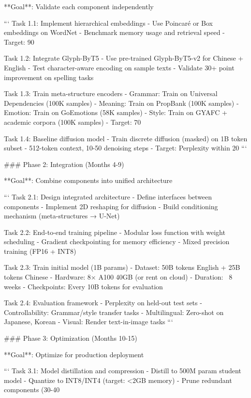 \documentclass[11pt]{article}
\begin{document}
**Goal**: Validate each component independently

```
Task 1.1: Implement hierarchical embeddings
- Use Poincaré or Box embeddings on WordNet
- Benchmark memory usage and retrieval speed
- Target: 90%

Task 1.2: Integrate Glyph-ByT5
- Use pre-trained Glyph-ByT5-v2 for Chinese + English
- Test character-aware encoding on sample texts
- Validate 30+ point improvement on spelling tasks

Task 1.3: Train meta-structure encoders
- Grammar: Train on Universal Dependencies (100K samples)
- Meaning: Train on PropBank (100K samples)  
- Emotion: Train on GoEmotions (58K samples)
- Style: Train on GYAFC + academic corpora (100K samples)
- Target: 70%

Task 1.4: Baseline diffusion model
- Train discrete diffusion (masked) on 1B token subset
- 512-token context, 10-50 denoising steps
- Target: Perplexity within 20%
```

### Phase 2: Integration (Months 4-9)

**Goal**: Combine components into unified architecture

```
Task 2.1: Design integrated architecture
- Define interfaces between components
- Implement 2D reshaping for diffusion
- Build conditioning mechanism (meta-structures → U-Net)

Task 2.2: End-to-end training pipeline
- Modular loss function with weight scheduling
- Gradient checkpointing for memory efficiency
- Mixed precision training (FP16 + INT8)

Task 2.3: Train initial model (1B params)
- Dataset: 50B tokens English + 25B tokens Chinese
- Hardware: 8× A100 40GB (or rent on cloud)
- Duration: ~8 weeks
- Checkpoints: Every 10B tokens for evaluation

Task 2.4: Evaluation framework
- Perplexity on held-out test sets
- Controllability: Grammar/style transfer tasks
- Multilingual: Zero-shot on Japanese, Korean
- Visual: Render text-in-image tasks
```

### Phase 3: Optimization (Months 10-15)

**Goal**: Optimize for production deployment

```
Task 3.1: Model distillation and compression
- Distill to 500M param student model
- Quantize to INT8/INT4 (target: <2GB memory)
- Prune redundant components (30-40%
\end{document}
